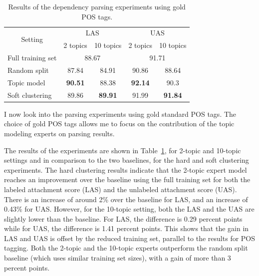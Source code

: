 \begin{table}[t!]
	\centering
	\begin{tabular}{l|cc|cc}
		\multicolumn{1}{c|}{\multirow{2}{*}{Setting}} & \multicolumn{2}{c|}{LAS}                                      & \multicolumn{2}{c}{UAS}                                     \\
		\multicolumn{1}{c|}{}                         & \multicolumn{1}{l}{2 topics} & \multicolumn{1}{r|}{10 topics} & \multicolumn{1}{l}{2 topics} & \multicolumn{1}{r}{10 topics} \\ \hline
		Full training set                             & \multicolumn{2}{c|}{88.67}                                    & \multicolumn{2}{c}{91.71}                                   \\
		Random split                                  & 87.84                        & 84.91                          & 90.86                        & 88.64                         \\
		Topic model                                   & \textbf{90.51}               & 88.38                          & \textbf{92.14}               & 90.3                          \\
		Soft clustering                               & 89.86                        & \textbf{89.91}                 & 91.99                        & \textbf{91.84}                \\ \hline
	\end{tabular}
	\caption{Results of the dependency parsing experiments using gold POS tags.}
	\label{tab:tmvsfs}
\end{table}

I now look into the parsing experiments using gold standard POS tags. The choice of gold POS tags allows me to focus on the contribution of the topic modeling experts on parsing results. 


The results of the experiments are shown in Table~\ref{tab:tmvsfs}, for 2-topic and 10-topic settings and in comparison to the two baselines, for the hard and soft clustering experiments. The hard clustering results indicate that the 2-topic expert model reaches an improvement over the baseline using the full training set for both the labeled attachment score (LAS) and the unlabeled attachment score (UAS). There is an increase of around 2\% over the baseline for LAS, and an increase of 0.43\% for UAS. However, for the 10-topic setting, both the LAS and the UAS are slightly lower than the baseline. For LAS, the difference is 0.29 percent points while for UAS, the difference is 1.41 percent points. This shows that the gain in LAS and UAS is offset by the reduced training set, parallel to the results for POS tagging. Both the 2-topic and the 10-topic experts outperform the random split baseline (which uses similar training set sizes), with a gain of more than 3 percent points.


